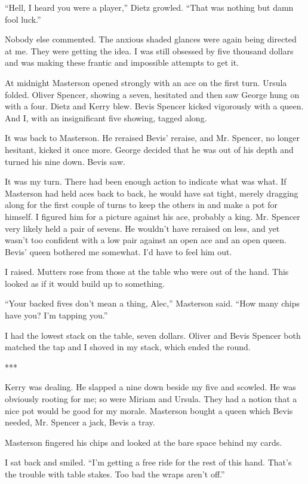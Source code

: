 {“Hell, I heard you were a player,” Dietz growled. “That was nothing but damn fool luck.”

Nobody else commented. The anxious shaded glances were again being directed at me. They were getting the idea. I was still obsessed by five thousand dollars and was making these frantic and impossible attempts to get it.

At midnight Masterson opened strongly with an ace on the first turn. Ursula folded. Oliver Spencer, showing a seven, hesitated and then saw George hung on with a four. Dietz and Kerry blew. Bevis Spencer kicked vigorously with a queen. And I, with an insignificant five showing, tagged along.

It was back to Masterson. He reraised Bevis’ reraise, and Mr. Spencer, no longer hesitant, kicked it once more. George decided that he was out of his depth and turned his nine down. Bevis saw.

It was my turn. There had been enough action to indicate what was what. If Masterson had held aces back to back, he would have sat tight, merely dragging along for the first couple of turns to keep the others in and make a pot for himself. I figured him for a picture against his ace, probably a king. Mr. Spencer very likely held a pair of sevens. He wouldn’t have reraised on less, and yet wasn’t too confident with a low pair against an open ace and an open queen. Bevis’ queen bothered me somewhat. I’d have to feel him out.

I raised. Mutters rose from those at the table who were out of the hand. This looked as if it would build up to something.

“Your backed fives don’t mean a thing, Alec,” Masterson said. “How many chips have you? I’m tapping you.”

I had the lowest stack on the table, seven dollars. Oliver and Bevis Spencer both matched the tap and I shoved in my stack, which ended the round.

***

Kerry was dealing. He slapped a nine down beside my five and scowled. He was obviously rooting for me; so were Miriam and Ursula. They had a notion that a nice pot would be good for my morale. Masterson bought a queen which Bevis needed, Mr. Spencer a jack, Bevis a tray.

Masterson fingered his chips and looked at the bare space behind my cards.

I sat back and smiled. “I’m getting a free ride for the rest of this hand. That’s the trouble with table stakes. Too bad the wraps aren’t off.”

}
